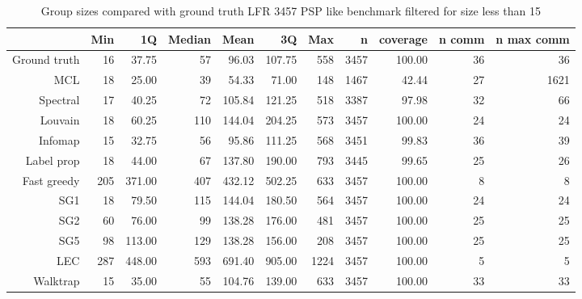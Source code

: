 \begin{table}[ht]
\centering
\setlength{\extrarowheight}{2pt}
\begin{adjustbox}{width=\textwidth}
\begin{tabular}{rrrrrrrrrrr}
  \toprule
 & Min & 1Q & Median & Mean & 3Q & Max & n & coverage & n comm &  n max comm \\ 
  \midrule
Ground truth & 16 & 37.75 & 57 & 96.03 & 107.75 & 558 & 3457 & 100.00 & 36 & 36 \\ 
  MCL & 18 & 25.00 & 39 & 54.33 & 71.00 & 148 & 1467 & 42.44 & 27 & 1621 \\ 
  Spectral & 17 & 40.25 & 72 & 105.84 & 121.25 & 518 & 3387 & 97.98 & 32 & 66 \\ 
  Louvain & 18 & 60.25 & 110 & 144.04 & 204.25 & 573 & 3457 & 100.00 & 24 & 24 \\ 
  Infomap & 15 & 32.75 & 56 & 95.86 & 111.25 & 568 & 3451 & 99.83 & 36 & 39 \\ 
  Label prop & 18 & 44.00 & 67 & 137.80 & 190.00 & 793 & 3445 & 99.65 & 25 & 26 \\ 
  Fast greedy & 205 & 371.00 & 407 & 432.12 & 502.25 & 633 & 3457 & 100.00 & 8 & 8 \\ 
  SG1 & 18 & 79.50 & 115 & 144.04 & 180.50 & 564 & 3457 & 100.00 & 24 & 24 \\ 
  SG2 & 60 & 76.00 & 99 & 138.28 & 176.00 & 481 & 3457 & 100.00 & 25 & 25 \\ 
  SG5 & 98 & 113.00 & 129 & 138.28 & 156.00 & 208 & 3457 & 100.00 & 25 & 25 \\ 
  LEC & 287 & 448.00 & 593 & 691.40 & 905.00 & 1224 & 3457 & 100.00 & 5 & 5 \\ 
  Walktrap & 15 & 35.00 & 55 & 104.76 & 139.00 & 633 & 3457 & 100.00 & 33 & 33 \\ 
   \bottomrule


\end{tabular}
\end{adjustbox}
\caption{Group sizes compared with ground truth LFR 3457 PSP like benchmark filtered for size less than 15} 
\label{tab:Group sizes compared with ground truth LFR 3457 PSP like benchmark filtered for size less than 15}
\end{table}

